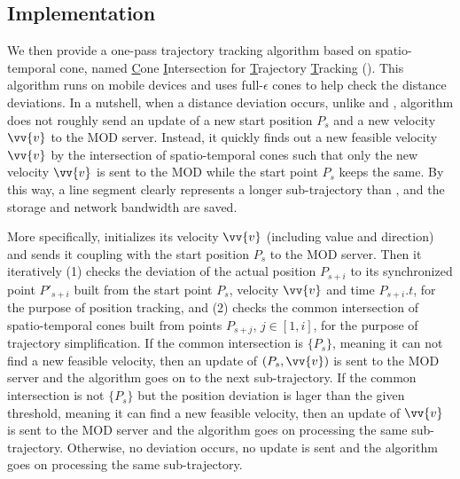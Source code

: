 \subsection{Implementation}
We then provide a one-pass trajectory tracking algorithm based on spatio-temporal cone, named \underline{C}one \underline{I}ntersection for \underline{T}rajectory \underline{T}racking (\citt). This algorithm runs on mobile devices and uses full-$\epsilon$ cones to help check the distance deviations. In a nutshell, when a distance deviation occurs, unlike \ldr and \ldrh, algorithm \citt does not roughly send an update of a new start position $P_s$ and a new velocity $\vv{v}$ to the MOD server. Instead, it quickly finds out a new feasible velocity $\vv{v}$ by the intersection of spatio-temporal cones such that only the new velocity $\vv{v}$ is sent to the MOD while the start point $P_s$ keeps the same. By this way, a line segment clearly represents a longer sub-trajectory than \ldrh, and the storage and network bandwidth are saved.

More specifically, \citt initializes its velocity $\vv{v}$ (including value and direction) and sends it coupling with the start position $P_s$ to the MOD server. Then it iteratively (1) checks the deviation of the actual position $P_{s+i}$ to its synchronized point $P'_{s+i}$ built from the start point $P_s$, velocity $\vv{v}$ and time $P_{s+i}.t$, for the purpose of position tracking, and (2) checks the common intersection of spatio-temporal cones built from points $P_{s+j}$, $j \in [1, i]$, for the purpose of trajectory simplification.
%
If the common intersection is $\{P_s\}$, meaning it can not find a new feasible velocity,
then an update of $(P_s, \vv{v})$ is sent to the MOD server and the algorithm goes on to the next sub-trajectory.
%
If the common intersection is not $\{P_s\}$ but the position deviation is lager than the given threshold, meaning it can find a new feasible velocity, then an update of $\vv{v}$ is sent to the MOD server and the algorithm goes on processing the same sub-trajectory.
%
Otherwise, no deviation occurs, no update is sent and the algorithm goes on processing the same sub-trajectory.



